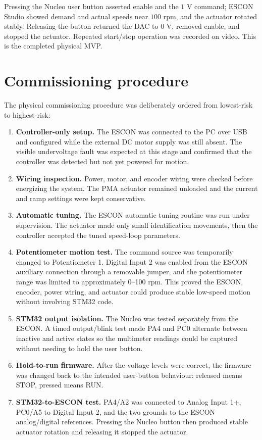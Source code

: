 \documentclass[11pt,a4paper]{report}
\begin{document}
Pressing the Nucleo user button asserted enable and the $1$ V command; ESCON Studio showed demand and actual speeds near $100$ rpm, and the actuator rotated stably. Releasing the button returned the DAC to $0$ V, removed enable, and stopped the actuator. Repeated start/stop operation was recorded on video. This is the completed physical MVP.

\section{Commissioning procedure}

The physical commissioning procedure was deliberately ordered from lowest-risk to highest-risk:

\begin{enumerate}
  \item \textbf{Controller-only setup.} The ESCON was connected to the PC over USB and configured while the external DC motor supply was still absent. The visible undervoltage fault was expected at this stage and confirmed that the controller was detected but not yet powered for motion.
  \item \textbf{Wiring inspection.} Power, motor, and encoder wiring were checked before energizing the system. The PMA actuator remained unloaded and the current and ramp settings were kept conservative.
  \item \textbf{Automatic tuning.} The ESCON automatic tuning routine was run under supervision. The actuator made only small identification movements, then the controller accepted the tuned speed-loop parameters.
  \item \textbf{Potentiometer motion test.} The command source was temporarily changed to Potentiometer 1. Digital Input 2 was enabled from the ESCON auxiliary connection through a removable jumper, and the potentiometer range was limited to approximately 0--100 rpm. This proved the ESCON, encoder, power wiring, and actuator could produce stable low-speed motion without involving STM32 code.
  \item \textbf{STM32 output isolation.} The Nucleo was tested separately from the ESCON. A timed output/blink test made PA4 and PC0 alternate between inactive and active states so the multimeter readings could be captured without needing to hold the user button.
  \item \textbf{Hold-to-run firmware.} After the voltage levels were correct, the firmware was changed back to the intended user-button behaviour: released means STOP, pressed means RUN.
  \item \textbf{STM32-to-ESCON test.} PA4/A2 was connected to Analog Input 1+, PC0/A5 to Digital Input 2, and the two grounds to the ESCON analog/digital references. Pressing the Nucleo button then produced stable actuator rotation and releasing it stopped the actuator.
\end{enumerate}
\end{document}
